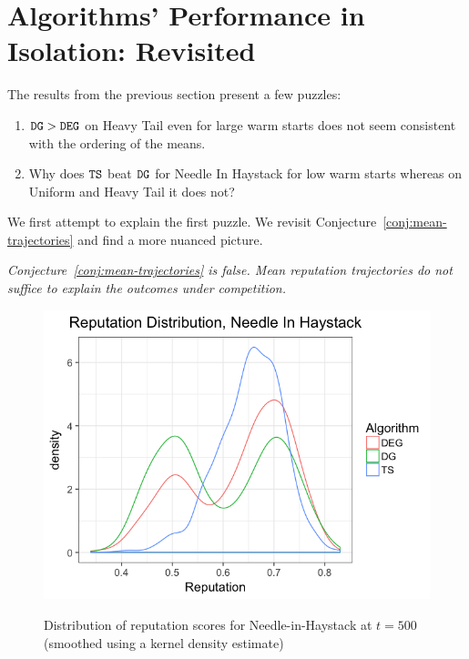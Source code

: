 \documentclass[../competing_bandits.tex]{subfiles}
\begin{document}
\section{Algorithms' Performance in Isolation: Revisited}\label{section:revisited}

The results from the previous section present a few puzzles:
\begin{enumerate}
\item $\mathtt{DG} > \mathtt{DEG}$ on Heavy Tail even for large warm starts does not seem consistent with the ordering of the means.
\item Why does $\mathtt{TS}$ beat $\mathtt{DG}$ for Needle In Haystack for low warm starts whereas on Uniform and Heavy Tail it does not?
\end{enumerate}

We first attempt to explain the first puzzle. We revisit Conjecture~\ref{conj:mean-trajectories} and find a more nuanced picture.

\begin{finding}
\textit{
Conjecture~\ref{conj:mean-trajectories} is false. Mean reputation trajectories do not suffice to explain the outcomes under competition.}
\end{finding}

\begin{figure}[ht]
\caption{Distribution of reputation scores for Needle-in-Haystack at $t=500$ (smoothed using a kernel density estimate)}
\includegraphics[scale=0.35]{figures/rep_distribution_nih}
\label{rep_dist_nih}
\end{figure}
\end{document}
